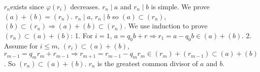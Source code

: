 \begin{answer}
    $r_{n}$exists since $\varphi(r_{i})$ decreases. $r_{n}\mid a$ and $r_{n}\mid b$ is simple. We prove $(a)+(b)=(r_{n})$. $r_{n}\mid a$, $r_{n}\mid b$ so $(a)\subset (r_{n})$, $(b)\subset (r_{n})\Rightarrow (a)+(b)\subset (r_{n})$. We use induction to prove $(r_{n})\subset (a)+(b)$: 1. For $i=1$, $a=q_{0}b+r\Rightarrow r_{1}=a-q_{0}b\in (a)+(b)$. 2. Assume for $i\leq m$, $(r_{i})\subset (a)+(b)$, $r_{m-1}=q_{m}r_{m}+r_{m-1}\Rightarrow r_{m+1}=r_{m-1}-q_{m}r_{m}\in (r_{m})+(r_{m-1})\subset (a)+(b)$. So $(r_{n})\subset (a)+(b)$. $r_{n}$ is the greatest common divisor of $a$ and $b$.
\end{answer}
